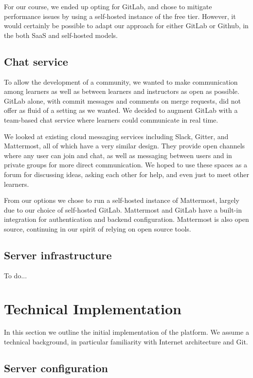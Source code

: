 \documentclass[12pt,twoside,vi]{mitthesis}
\newcommand{\wip}[1]{{\color{red} To do...}}
\begin{document}
For our course, we ended up opting for GitLab, and chose to mitigate performance issues by using a self-hosted instance of the free tier. However, it would certainly be possible to adapt our approach for either GitLab or Github, in the both SaaS and self-hosted models.

\subsection{Chat service}

To allow the development of a community, we wanted to make communication among learners as well as between learners and instructors as open as possible. GitLab alone, with commit messages and comments on merge requests, did not offer as fluid of a setting as we wanted. We decided to augment GitLab with a team-based chat service where learners could communicate in real time.

We looked at existing cloud messaging services including Slack, Gitter, and Mattermost, all of which have a very similar design. They provide open channels where any user can join and chat, as well as messaging between users and in private groups for more direct communication. We hoped to use these spaces as a forum for discussing ideas, asking each other for help, and even just to meet other learners.

From our options we chose to run a self-hosted instance of Mattermost, largely due to our choice of self-hosted GitLab. Mattermost and GitLab have a built-in integration for authentication and backend configuration. Mattermost is also open source, continuing in our spirit of relying on open source tools.

\subsection{Server infrastructure}

\wip{reliance on other software (letsencrypt, nginx, python and javascript, bash)}

\section{Technical Implementation}

In this section we outline the initial implementation of the platform. We assume a technical background, in particular familiarity with Internet architecture and Git.

\subsection{Server configuration}
\end{document}

